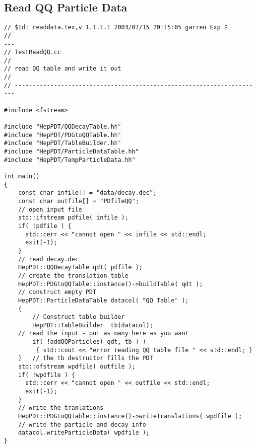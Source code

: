 \subsection { Read QQ Particle Data }
\begin{verbatim}
// $Id: readdata.tex,v 1.1.1.1 2003/07/15 20:15:05 garren Exp $
// ----------------------------------------------------------------------
// TestReadQQ.cc
//
// read QQ table and write it out
//
// ----------------------------------------------------------------------

#include <fstream>

#include "HepPDT/QQDecayTable.hh"
#include "HepPDT/PDGtoQQTable.hh"
#include "HepPDT/TableBuilder.hh"
#include "HepPDT/ParticleDataTable.hh"
#include "HepPDT/TempParticleData.hh"

int main()
{
    const char infile[] = "data/decay.dec";
    const char outfile[] = "PDfileQQ";
    // open input file
    std::ifstream pdfile( infile );
    if( !pdfile ) { 
      std::cerr << "cannot open " << infile << std::endl;
      exit(-1);
    }
    // read decay.dec 
    HepPDT::QQDecayTable qdt( pdfile );
    // create the translation table
    HepPDT::PDGtoQQTable::instance()->buildTable( qdt );
    // construct empty PDT
    HepPDT::ParticleDataTable datacol( "QQ Table" );
    {
        // Construct table builder
        HepPDT::TableBuilder  tb(datacol);
	// read the input - put as many here as you want
        if( !addQQParticles( qdt, tb ) ) 
	     { std::cout << "error reading QQ table file " << std::endl; }
    }	// the tb destructor fills the PDT
    std::ofstream wpdfile( outfile );
    if( !wpdfile ) { 
      std::cerr << "cannot open " << outfile << std::endl;
      exit(-1);
    }
    // write the tranlations
    HepPDT::PDGtoQQTable::instance()->writeTranslations( wpdfile );
    // write the particle and decay info
    datacol.writeParticleData( wpdfile );
}
\end{verbatim}

\vfill\eject
